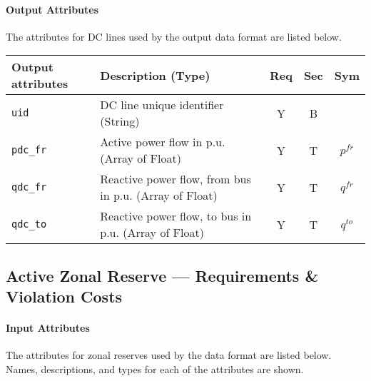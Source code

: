 \documentclass{article}
\begin{document}
\paragraph{Output Attributes}
 The attributes for DC lines
 used by the output data format are listed below.
\begin{center}
\small
\begin{tabular}{ l | l | c | c | c | }
Output attributes & Description (Type) & Req & Sec & Sym\\
\hline
  {\tt uid}    & DC line unique identifier (String)& Y & B & \\
  {\tt pdc\_fr} & Active power flow in p.u. (Array of Float)& Y & T & $p^{fr}$ \\
  {\tt qdc\_fr} & Reactive power flow, from bus in p.u. (Array of Float)& Y & T & $q^{fr}$ \\
  {\tt qdc\_to} & Reactive power flow, to bus in p.u. (Array of Float)& Y & T & $q^{to}$ \\
  \hline
\end{tabular}
\end{center}

\subsection{Active Zonal Reserve ---  Requirements \& Violation Costs}
\label{nom:reserves_active}

\paragraph{Input Attributes}
The attributes for zonal reserves
used by the data format are listed below.
Names, descriptions, and types for each of the attributes are shown.
\end{document}
